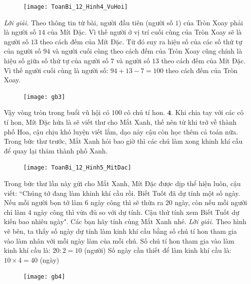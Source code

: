 \begin{multicols}{2}
	\begin{figure}[H]
		\centering
		\vspace*{-5pt}
		\captionsetup{labelformat= empty, justification=centering}
		\texttt{[image: ToanBi\_12\_Hinh4\_VuHoi]}
		\vspace*{-15pt}
	\end{figure}
	\textit{Lời giải.} Theo thông tin từ bài, người đầu tiên (người số $1$) của Tròn Xoay phải là người số $14$ của Mít Đặc. Vì thế người ở vị trí cuối cùng của Tròn Xoay sẽ là người số $13$ theo cách đếm của Mít Đặc. Từ đó suy ra hiệu số của các số thứ tự của người số $94$ và người cuối cùng theo cách đếm của Tròn Xoay cũng chính là hiệu số giữa số thứ tự của người số $7$ và người số $13$ theo cách đếm của Mít Đặc. Vì thế người cuối cùng là người số: $94+ 13-7=100$ theo cách đếm của Tròn Xoay.
	\begin{figure}[H]
		\centering
		\vspace*{-5pt}
		\captionsetup{labelformat= empty, justification=centering}
		\texttt{[image: gb3]}
		\vspace*{-10pt}
	\end{figure}
	Vậy vòng tròn trong buổi vũ hội có $100$ cô chú tí hon.
	\vskip 0.1cm
	$\pmb{4.}$ Khi chia tay với các cô tí hon, Mít Đặc hứa là sẽ viết thư cho Mắt Xanh, thế nên từ khi trở về thành phố Hoa, cậu chịu khó luyện viết lắm, dạo này cậu còn học thêm cả toán nữa. Trong bức thư trước, Mắt Xanh hỏi bao giờ thì các chú làm xong khinh khí cầu để quay lại thăm thành phố Xanh.
	\begin{figure}[H]
		\centering
		\vspace*{-5pt}
		\captionsetup{labelformat= empty, justification=centering}
		\texttt{[image: ToanBi\_12\_Hinh5\_MitDac]}
		\vspace*{-10pt}
	\end{figure}
	Trong bức thư lần này gửi cho Mắt Xanh, Mít Đặc được dịp thể hiện luôn, cậu viết: ``Chúng tớ đang làm khinh khí cầu rồi. Biết Tuốt đã dự tính một số ngày. Nếu mỗi người bọn tớ làm $6$ ngày công thì sẽ thừa ra $20$ ngày, còn nếu mỗi người chỉ làm $4$ ngày công thì vừa đủ so với dự tính. Cậu thử tính xem Biết Tuốt dự kiến bao nhiêu ngày". Các bạn hãy tính cùng Mắt Xanh nhé.
	\vskip 0.1cm
	\textit{Lời giải.} Theo hình vẽ bên, ta thấy số ngày dự tính làm kinh khí cầu bằng số chú tí hon tham gia vào làm nhân với mỗi ngày làm của mỗi chú.
	\vskip 0.1cm
	Số chú tí hon tham gia vào làm kinh khí cầu là: $20 : 2 = 10$ (người)
	\vskip 0.1cm
	Số ngày cần thiết để làm kinh khí cầu là: $10 \times 4 = 40$ (ngày)
	\begin{figure}[H]
		\centering
		\vspace*{-5pt}
		\captionsetup{labelformat= empty, justification=centering}
		\texttt{[image: gb4]}
		\vspace*{-10pt}
	\end{figure}
\end{multicols}

